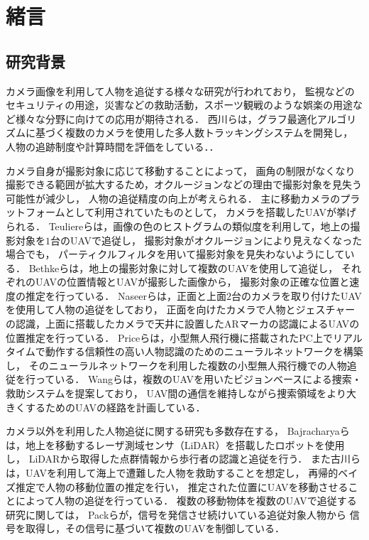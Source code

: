 \documentclass[autodetect-engine,dvipdfmx-if-dvi,ja=standard,a4j,jbase=11pt,magstyle=nomag*]{bxjsreport}
\begin{document}
\chapter{緒言}

\section{研究背景}
カメラ画像を利用して人物を追従する様々な研究が行われており，
監視などのセキュリティの用途，災害などの救助活動，スポーツ観戦のような娯楽の用途など様々な分野に向けての応用が期待される．
西川らは，グラフ最適化アルゴリズムに基づく複数のカメラを使用した多人数トラッキングシステムを開発し，
人物の追跡制度や計算時間を評価をしている．\cite{nishikawa_2018, nishikawa_2018_2}．

カメラ自身が撮影対象に応じて移動することによって，
画角の制限がなくなり撮影できる範囲が拡大するため，オクルージョンなどの理由で撮影対象を見失う可能性が減少し，
人物の追従精度の向上が考えられる．
主に移動カメラのプラットフォームとして利用されていたものとして，
カメラを搭載したUAVが挙げられる．
Teuliereらは，画像の色のヒストグラムの類似度を利用して，地上の撮影対象を$1$台のUAVで追従し，
撮影対象がオクルージョンにより見えなくなった場合でも，
パーティクルフィルタを用いて撮影対象を見失わないようにしている\cite{Teuliere_2011}．
Bethkeらは，地上の撮影対象に対して複数のUAVを使用して追従し，
それぞれのUAVの位置情報とUAVが撮影した画像から，
撮影対象の正確な位置と速度の推定を行っている\cite{bethke_2007}．
Naseerらは，正面と上面$2$台のカメラを取り付けたUAVを使用して人物の追従をしており，
正面を向けたカメラで人物とジェスチャーの認識，上面に搭載したカメラで天井に設置したARマーカの認識によるUAVの位置推定を行っている\cite{nasser_2013}．
Priceらは，小型無人飛行機に搭載されたPC上でリアルタイムで動作する信頼性の高い人物認識のためのニューラルネットワークを構築し，
そのニューラルネットワークを利用した複数の小型無人飛行機での人物追従を行っている\cite{price_2018}．
Wangらは，複数のUAVを用いたビジョンベースによる捜索・救助システムを提案しており，
UAV間の通信を維持しながら捜索領域をより大きくするためのUAVの経路を計画している\cite{wang_2009}．

カメラ以外を利用した人物追従に関する研究も多数存在する，
Bajracharyaらは，地上を移動するレーザ測域センサ（LiDAR）を搭載したロボットを使用し，
LiDARから取得した点群情報から歩行者の認識と追従を行う\cite{bajracharya_2009}．
また古川らは，UAVを利用して海上で遭難した人物を救助することを想定し，
再帰的ベイズ推定で人物の移動位置の推定を行い，
推定された位置にUAVを移動させることによって人物の追従を行っている\cite{furukawa_2006, furukawa_2012}．
複数の移動物体を複数のUAVで追従する研究に関しては，
Packらが，信号を発信させ続けいている追従対象人物から
信号を取得し，その信号に基づいて複数のUAVを制御している\cite{pack_2009}．
\end{document}
